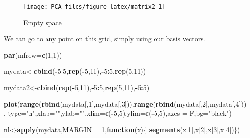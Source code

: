 \documentclass[
]{book}
\newenvironment{Shaded}{\begin{snugshade}}{\end{snugshade}}
\newcommand{\ControlFlowTok}[1]{\textcolor[rgb]{0.13,0.29,0.53}{\textbf{#1}}}
\newcommand{\DataTypeTok}[1]{\textcolor[rgb]{0.13,0.29,0.53}{#1}}
\newcommand{\DecValTok}[1]{\textcolor[rgb]{0.00,0.00,0.81}{#1}}
\newcommand{\KeywordTok}[1]{\textcolor[rgb]{0.13,0.29,0.53}{\textbf{#1}}}
\newcommand{\NormalTok}[1]{#1}
\newcommand{\OperatorTok}[1]{\textcolor[rgb]{0.81,0.36,0.00}{\textbf{#1}}}
\newcommand{\StringTok}[1]{\textcolor[rgb]{0.31,0.60,0.02}{#1}}
\theoremstyle{definition}
\theoremstyle{definition}
\theoremstyle{definition}
\theoremstyle{remark}
\begin{document}
\begin{figure}

{\centering \texttt{[image: PCA\_files/figure-latex/matrix2-1]} 

}

\caption{Empty space}\label{fig:matrix2}
\end{figure}

We can go to any point on this grid, simply using our basis vectors.

\begin{Shaded}
\begin{Highlighting}[]
\KeywordTok{par}\NormalTok{(}\DataTypeTok{mfrow=}\KeywordTok{c}\NormalTok{(}\DecValTok{1}\NormalTok{,}\DecValTok{1}\NormalTok{))}

\NormalTok{mydata<-}\KeywordTok{cbind}\NormalTok{(}\OperatorTok{-}\DecValTok{5}\OperatorTok{:}\DecValTok{5}\NormalTok{,}\KeywordTok{rep}\NormalTok{(}\OperatorTok{-}\DecValTok{5}\NormalTok{,}\DecValTok{11}\NormalTok{),}\OperatorTok{-}\DecValTok{5}\OperatorTok{:}\DecValTok{5}\NormalTok{,}\KeywordTok{rep}\NormalTok{(}\DecValTok{5}\NormalTok{,}\DecValTok{11}\NormalTok{))}

\NormalTok{mydata2<-}\KeywordTok{cbind}\NormalTok{(}\KeywordTok{rep}\NormalTok{(}\OperatorTok{-}\DecValTok{5}\NormalTok{,}\DecValTok{11}\NormalTok{),}\OperatorTok{-}\DecValTok{5}\OperatorTok{:}\DecValTok{5}\NormalTok{,}\KeywordTok{rep}\NormalTok{(}\DecValTok{5}\NormalTok{,}\DecValTok{11}\NormalTok{),}\OperatorTok{-}\DecValTok{5}\OperatorTok{:}\DecValTok{5}\NormalTok{)}

\KeywordTok{plot}\NormalTok{(}\KeywordTok{range}\NormalTok{(}\KeywordTok{rbind}\NormalTok{(mydata[,}\DecValTok{1}\NormalTok{],mydata[,}\DecValTok{3}\NormalTok{])),}\KeywordTok{range}\NormalTok{(}\KeywordTok{rbind}\NormalTok{(mydata[,}\DecValTok{2}\NormalTok{],mydata[,}\DecValTok{4}\NormalTok{])),}
     \DataTypeTok{type=}\StringTok{"n"}\NormalTok{,}\DataTypeTok{xlab=}\StringTok{""}\NormalTok{,}\DataTypeTok{ylab=}\StringTok{""}\NormalTok{,}\DataTypeTok{xlim=}\KeywordTok{c}\NormalTok{(}\OperatorTok{-}\DecValTok{5}\NormalTok{,}\DecValTok{5}\NormalTok{),}\DataTypeTok{ylim=}\KeywordTok{c}\NormalTok{(}\OperatorTok{-}\DecValTok{5}\NormalTok{,}\DecValTok{5}\NormalTok{),}\DataTypeTok{axes =}\NormalTok{ F,}\DataTypeTok{bg=}\StringTok{"black"}\NormalTok{)}


\NormalTok{nl<-}\KeywordTok{apply}\NormalTok{(mydata,}\DataTypeTok{MARGIN =} \DecValTok{1}\NormalTok{,}\ControlFlowTok{function}\NormalTok{(x)\{}
  \KeywordTok{segments}\NormalTok{(x[}\DecValTok{1}\NormalTok{],x[}\DecValTok{2}\NormalTok{],x[}\DecValTok{3}\NormalTok{],x[}\DecValTok{4}\NormalTok{])\})}


\end{Highlighting}
\end{Shaded}
\end{document}
